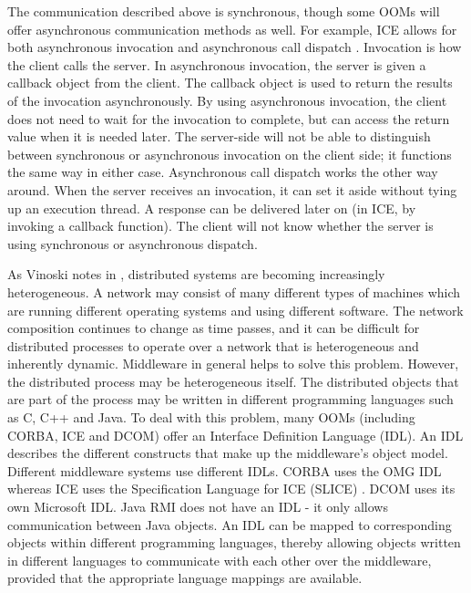 \documentclass{acm_proc_article-sp}
\begin{document}
The communication described above is synchronous, though some OOMs will offer asynchronous communication methods as well.  For example, ICE allows for both asynchronous invocation and asynchronous call dispatch \cite{Henning:2004p8372}.  Invocation is how the client calls the server.  In asynchronous invocation, the server is given a callback object from the client.  The callback object is used to return the results of the invocation asynchronously.  By using asynchronous invocation, the client does not need to wait for the invocation to complete, but can access the return value when it is needed later.  The server-side will not be able to distinguish between synchronous or asynchronous invocation on the client side; it functions the same way in either case.  Asynchronous call dispatch works the other way around.  When the server receives an invocation, it can set it aside without tying up an execution thread.  A response can be delivered later on (in ICE, by invoking a callback function).  The client will not know whether the server is using synchronous or asynchronous dispatch.

As Vinoski notes in \cite{Vinoski:2004p8371}, distributed systems are becoming increasingly heterogeneous.  A network may consist of many different types of machines which are running different operating systems and using different software.  The network composition continues to change as time passes, and it can be difficult for distributed processes to operate over a network that is heterogeneous and inherently dynamic.  Middleware in general helps to solve this problem.  However, the distributed process may be heterogeneous itself.  The distributed objects that are part of the process may be written in different programming languages such as C, C++ and Java.  To deal with this problem, many OOMs (including CORBA, ICE and DCOM) offer an Interface Definition Language (IDL).  An IDL describes the different constructs that make up the middleware's object model.  Different middleware systems use different IDLs.  CORBA uses the OMG IDL whereas ICE uses the Specification Language for ICE (SLICE) \cite{Henning:2004p8372}.  DCOM uses its own Microsoft IDL.  Java RMI does not have an IDL - it only allows communication between Java objects.  An IDL can be mapped to corresponding objects within different programming languages, thereby allowing objects written in different languages to communicate with each other over the middleware, provided that the appropriate language mappings are available.

\end{document}

